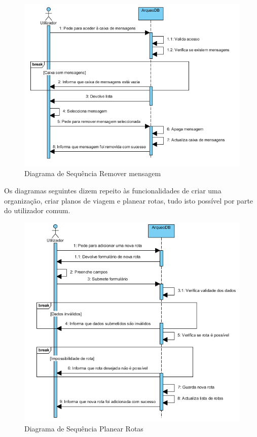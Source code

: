 ﻿\documentclass[12pt,a4paper]{article}
\begin{document}
\begin{figure}[h!]
\centering
\includegraphics[scale=0.8]{sequencia/apagarmensagem}
\caption{Diagrama de Sequência Remover mensagem} 
\end{figure}

\clearpage
Os diagramas seguintes dizem repeito às funcionalidades de criar uma organização, criar planos de viagem e planear rotas, tudo isto possível por parte do utilizador comum.\\

\begin{figure}[h!]
\centering
\includegraphics[scale=1]{sequencia/planearrotas}
\caption{Diagrama de Sequência Planear Rotas} 
\end{figure}
\end{document}
